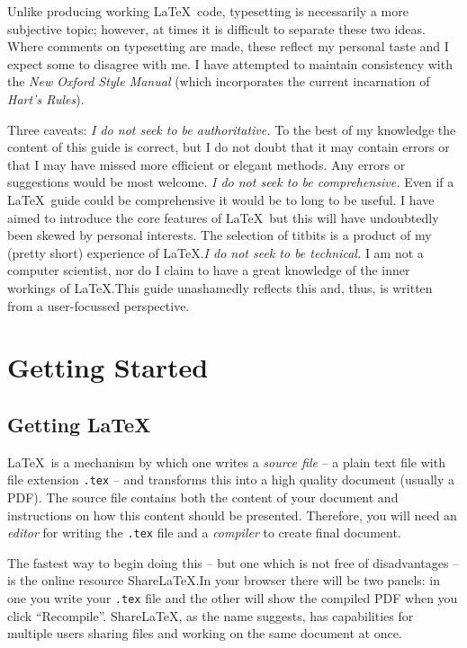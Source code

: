 \documentclass[11pt]{article}
\theoremstyle{definition}
\theoremstyle{plain}
\begin{document}
Unlike producing working \LaTeX\ code, typesetting is necessarily a more subjective topic; however, at times it is difficult to separate these two ideas. Where comments on typesetting are made, these reflect my personal taste and I expect some to disagree with me. I have attempted to maintain consistency with the \emph{New Oxford Style Manual} \cite{ref:oxford_manual} (which incorporates the current incarnation of \emph{Hart's Rules}).

Three caveats: \emph{I do not seek to be authoritative.} To the best of my knowledge the content of this guide is correct, but I do not doubt that it may contain errors or that I may have missed more efficient or elegant methods. Any errors or suggestions would be most welcome. \emph{I do not seek to be comprehensive.} Even if a \LaTeX\ guide could be comprehensive it would be to long to be useful. I have aimed to introduce the core features of \LaTeX\ but this will have undoubtedly been skewed by personal interests. The selection of titbits is a product of my (pretty short) experience of \LaTeX.\@ \emph{I do not seek to be technical.} I am not a computer scientist, nor do I claim to have a great knowledge of the inner workings of \LaTeX.\@ This guide unashamedly reflects this and, thus, is written from a user-focussed perspective.



\section{Getting Started} \label{sec:gs}
\subsection{Getting \LaTeX} \label{ssec:gs_getting_latex}
\LaTeX\ is a mechanism by which one writes a \emph{source file} -- a plain text file with file extension \texttt{.tex} -- and transforms this into a high quality document (usually a PDF). The source file contains both the content of your document and instructions on how this content should be presented. Therefore, you will need an \emph{editor} for writing the \texttt{.tex} file and a \emph{compiler} to create final document.

The fastest way to begin doing this -- but one which is not free of disadvantages -- is the online resource ShareLaTeX.\@ In your browser there will be two panels: in one you write your \texttt{.tex} file and the other will show the compiled PDF when you click ``Recompile''. ShareLaTeX, as the name suggests, has capabilities for multiple users sharing files and working on the same document at once.
\end{document}
